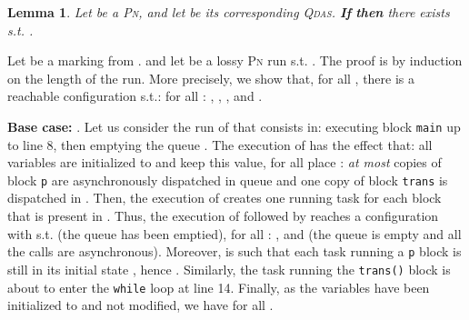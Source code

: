 \documentclass[runningheads,oribibl,]{article}
\newcommand{\pn}{\textsc{Pn}\xspace}
\newcommand{\qdas}{\textsc{Qdas}\xspace}
\newtheorem{lemma}{Lemma}{}
\newenvironment{proof}{\noindent{\it Proof.\hspace*{.5cm}}}{}
\begin{document}
\begin{lemma}
  Let  be a \pn, and let  be its corresponding \qdas.
  \textbf{If}  \textbf{then} there exists
   s.t. .
\end{lemma}
\begin{proof}
  Let  be a marking from .  and let 
  be a lossy \pn run s.t. . The proof is by induction on
  the length of the run. More precisely, we show that, for all , there is a reachable configuration
   s.t.: for all :
  , , ,  and
  .

  \textbf{Base case: }. Let us consider the run of  that
  consists in:  executing block \texttt{main} up to line 8, then
   emptying the queue . The execution of  has the effect
  that:  all  variables are initialized to  and keep this
  value,  for all place : \emph{at most}  copies of
  block \texttt{p} are asynchronously dispatched in queue  and
   one copy of block \texttt{trans} is dispatched in . Then,
  the execution of  creates one running task for each block that
  is present in . Thus, the execution of  followed by 
  reaches a configuration  with
   s.t.  (the queue has been emptied),
  for all : ,
   and
   (the queue is empty and all the calls are
  asynchronous). Moreover,  is such that each task running a
  \texttt{p} block is still in its initial state , hence
  . Similarly, the task running the \texttt{trans()}
  block is about to enter the \texttt{while} loop at line 14. Finally,
  as the variables have been initialized to  and not modified, we
  have  for all .


\end{proof}
\end{document}
